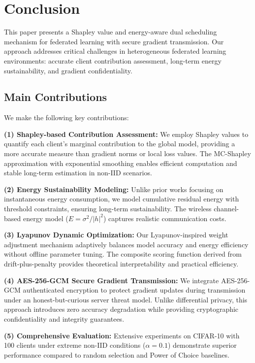 \section{Conclusion}

This paper presents a Shapley value and energy-aware dual scheduling mechanism for federated learning with secure gradient transmission. Our approach addresses critical challenges in heterogeneous federated learning environments: accurate client contribution assessment, long-term energy sustainability, and gradient confidentiality.

\subsection{Main Contributions}

We make the following key contributions:

\textbf{(1) Shapley-based Contribution Assessment:} We employ Shapley values to quantify each client's marginal contribution to the global model, providing a more accurate measure than gradient norms or local loss values. The MC-Shapley approximation with exponential smoothing enables efficient computation and stable long-term estimation in non-IID scenarios.

\textbf{(2) Energy Sustainability Modeling:} Unlike prior works focusing on instantaneous energy consumption, we model cumulative residual energy with threshold constraints, ensuring long-term sustainability. The wireless channel-based energy model ($E = \sigma^2/|h|^2$) captures realistic communication costs.

\textbf{(3) Lyapunov Dynamic Optimization:} Our Lyapunov-inspired weight adjustment mechanism adaptively balances model accuracy and energy efficiency without offline parameter tuning. The composite scoring function derived from drift-plus-penalty provides theoretical interpretability and practical efficiency.

\textbf{(4) AES-256-GCM Secure Gradient Transmission:} We integrate AES-256-GCM authenticated encryption to protect gradient updates during transmission under an honest-but-curious server threat model. Unlike differential privacy, this approach introduces zero accuracy degradation while providing cryptographic confidentiality and integrity guarantees.

\textbf{(5) Comprehensive Evaluation:} Extensive experiments on CIFAR-10 with 100 clients under extreme non-IID conditions ($\alpha=0.1$) demonstrate superior performance compared to random selection and Power of Choice baselines.

